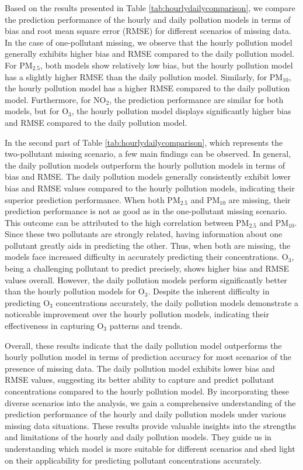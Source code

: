 \documentclass[
  12,
]{article}
\begin{document}
Based on the results presented in Table \ref{tab:hourlydailycomparison},
we compare the prediction performance of the hourly and daily pollution
models in terms of bias and root mean square error (RMSE) for different
scenarios of missing data. In the case of one-pollutant missing, we
observe that the hourly pollution model generally exhibits higher bias
and RMSE compared to the daily pollution model. For PM\(_{2.5}\), both
models show relatively low bias, but the hourly pollution model has a
slightly higher RMSE than the daily pollution model. Similarly, for
PM\(_{10}\), the hourly pollution model has a higher RMSE compared to
the daily pollution model. Furthermore, for NO\(_2\), the prediction
performance are similar for both models, but for O\(_3\), the hourly
pollution model displays significantly higher bias and RMSE compared to
the daily pollution model.

In the second part of Table \ref{tab:hourlydailycomparison}, which
represents the two-pollutant missing scenario, a few main findings can
be observed. In general, the daily pollution models outperform the
hourly pollution models in terms of bias and RMSE. The daily pollution
models generally consistently exhibit lower bias and RMSE values
compared to the hourly pollution models, indicating their superior
prediction performance. When both PM\(_{2.5}\) and PM\(_{10}\) are
missing, their prediction performance is not as good as in the
one-pollutant missing scenario. This outcome can be attributed to the
high correlation between PM\(_{2.5}\) and PM\(_{10}\). Since these two
pollutants are strongly related, having information about one pollutant
greatly aids in predicting the other. Thus, when both are missing, the
models face increased difficulty in accurately predicting their
concentrations. O\(_3\), being a challenging pollutant to predict
precisely, shows higher bias and RMSE values overall. However, the daily
pollution models perform significantly better than the hourly pollution
models for O\(_3\). Despite the inherent difficulty in predicting
O\(_3\) concentrations accurately, the daily pollution models
demonstrate a noticeable improvement over the hourly pollution models,
indicating their effectiveness in capturing O\(_3\) patterns and trends.

Overall, these results indicate that the daily pollution model
outperforms the hourly pollution model in terms of prediction accuracy
for most scenarios of the presence of missing data. The daily pollution
model exhibits lower bias and RMSE values, suggesting its better ability
to capture and predict pollutant concentrations compared to the hourly
pollution model. By incorporating these diverse scenarios into the
analysis, we gain a comprehensive understanding of the prediction
performance of the hourly and daily pollution models under various
missing data situations. These results provide valuable insights into
the strengths and limitations of the hourly and daily pollution models.
They guide us in understanding which model is more suitable for
different scenarios and shed light on their applicability for predicting
pollutant concentrations accurately.
\end{document}
